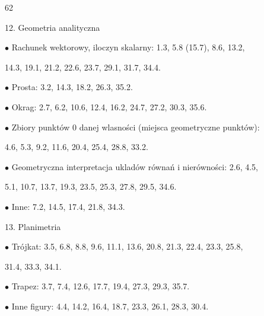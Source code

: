 \documentclass[a4paper,12pt]{article}
\begin{document}
62

12. Geometria analityczna

$\bullet$ Rachunek wektorowy, iloczyn skalarny: 1.3, 5.8 (15.7), 8.6, 13.2,

14.3, 19.1, 21.2, 22.6, 23.7, 29.1, 31.7, 34.4.

$\bullet$ Prosta: 3.2, 14.3, 18.2, 26.3, 35.2.

$\bullet$ Okrag: 2.7, 6.2, 10.6, 12.4, 16.2, 24.7, 27.2, 30.3, 35.6.

$\bullet$ Zbiory punktów $0$ danej wlasności (miejsca geometryczne punktów):

4.6, 5.3, 9.2, 11.6, 20.4, 25.4, 28.8, 33.2.

$\bullet$ Geometryczna interpretacja ukladów równań $\mathrm{i}$ nierówności: 2.6, 4.5,

5.1, 10.7, 13.7, 19.3, 23.5, 25.3, 27.8, 29.5, 34.6.

$\bullet$ Inne: 7.2, 14.5, 17.4, 21.8, 34.3.

13. Planimetria

$\bullet$ Trójkat: 3.5, 6.8, 8.8, 9.6, 11.1, 13.6, 20.8, 21.3, 22.4, 23.3, 25.8,

31.4, 33.3, 34.1.

$\bullet$ Trapez: 3.7, 7.4, 12.6, 17.7, 19.4, 27.3, 29.3, 35.7.

$\bullet$ Inne figury: 4.4, 14.2, 16.4, 18.7, 23.3, 26.1, 28.3, 30.4.
\end{document}
